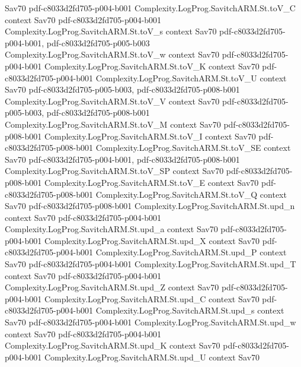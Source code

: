 \begin{theorem}
  {Sav70}
  {pdf-c8033d2fd705-p004-b001}
\proofstep
  {Complexity.LogProg.SavitchARM.St.toV_C}
  {context}
  {Sav70}
  {pdf-c8033d2fd705-p004-b001}
\proofstep
  {Complexity.LogProg.SavitchARM.St.toV_s}
  {context}
  {Sav70}
  {pdf-c8033d2fd705-p004-b001,
    pdf-c8033d2fd705-p005-b003}
\proofstep
  {Complexity.LogProg.SavitchARM.St.toV_w}
  {context}
  {Sav70}
  {pdf-c8033d2fd705-p004-b001}
\proofstep
  {Complexity.LogProg.SavitchARM.St.toV_K}
  {context}
  {Sav70}
  {pdf-c8033d2fd705-p004-b001}
\proofstep
  {Complexity.LogProg.SavitchARM.St.toV_U}
  {context}
  {Sav70}
  {pdf-c8033d2fd705-p005-b003,
    pdf-c8033d2fd705-p008-b001}
\proofstep
  {Complexity.LogProg.SavitchARM.St.toV_V}
  {context}
  {Sav70}
  {pdf-c8033d2fd705-p005-b003,
    pdf-c8033d2fd705-p008-b001}
\proofstep
  {Complexity.LogProg.SavitchARM.St.toV_M}
  {context}
  {Sav70}
  {pdf-c8033d2fd705-p008-b001}
\proofstep
  {Complexity.LogProg.SavitchARM.St.toV_I}
  {context}
  {Sav70}
  {pdf-c8033d2fd705-p008-b001}
\proofstep
  {Complexity.LogProg.SavitchARM.St.toV_SE}
  {context}
  {Sav70}
  {pdf-c8033d2fd705-p004-b001,
    pdf-c8033d2fd705-p008-b001}
\proofstep
  {Complexity.LogProg.SavitchARM.St.toV_SP}
  {context}
  {Sav70}
  {pdf-c8033d2fd705-p008-b001}
\proofstep
  {Complexity.LogProg.SavitchARM.St.toV_E}
  {context}
  {Sav70}
  {pdf-c8033d2fd705-p008-b001}
\proofstep
  {Complexity.LogProg.SavitchARM.St.toV_Q}
  {context}
  {Sav70}
  {pdf-c8033d2fd705-p008-b001}
\proofstep
  {Complexity.LogProg.SavitchARM.St.upd_n}
  {context}
  {Sav70}
  {pdf-c8033d2fd705-p004-b001}
\proofstep
  {Complexity.LogProg.SavitchARM.St.upd_a}
  {context}
  {Sav70}
  {pdf-c8033d2fd705-p004-b001}
\proofstep
  {Complexity.LogProg.SavitchARM.St.upd_X}
  {context}
  {Sav70}
  {pdf-c8033d2fd705-p004-b001}
\proofstep
  {Complexity.LogProg.SavitchARM.St.upd_P}
  {context}
  {Sav70}
  {pdf-c8033d2fd705-p004-b001}
\proofstep
  {Complexity.LogProg.SavitchARM.St.upd_T}
  {context}
  {Sav70}
  {pdf-c8033d2fd705-p004-b001}
\proofstep
  {Complexity.LogProg.SavitchARM.St.upd_Z}
  {context}
  {Sav70}
  {pdf-c8033d2fd705-p004-b001}
\proofstep
  {Complexity.LogProg.SavitchARM.St.upd_C}
  {context}
  {Sav70}
  {pdf-c8033d2fd705-p004-b001}
\proofstep
  {Complexity.LogProg.SavitchARM.St.upd_s}
  {context}
  {Sav70}
  {pdf-c8033d2fd705-p004-b001}
\proofstep
  {Complexity.LogProg.SavitchARM.St.upd_w}
  {context}
  {Sav70}
  {pdf-c8033d2fd705-p004-b001}
\proofstep
  {Complexity.LogProg.SavitchARM.St.upd_K}
  {context}
  {Sav70}
  {pdf-c8033d2fd705-p004-b001}
\proofstep
  {Complexity.LogProg.SavitchARM.St.upd_U}
  {context}
  {Sav70}

\end{theorem}
